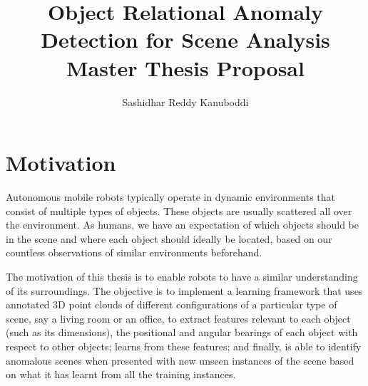 \documentclass[12pt]{article}
\begin{document}

\title{\textbf{Object Relational Anomaly Detection for Scene Analysis}\bigbreak
Master Thesis Proposal}
\author{Sashidhar Reddy Kanuboddi}

\maketitle


\newpage

\tableofcontents{}


\newpage

\section{Motivation}

Autonomous mobile robots typically operate in dynamic environments that consist of multiple types of objects. These objects are usually scattered all over the environment. As humans, we have an expectation of which objects should be in the scene and where each object should ideally be located, based on our countless observations of similar environments beforehand.

The motivation of this thesis is to enable robots to have a similar understanding of its surroundings. The objective is to implement a learning framework that uses annotated 3D point clouds of different configurations of a particular type of scene, say a living room or an office, to extract features relevant to each object (such as its dimensions), the positional and angular bearings of each object with respect to other objects; learns from these features; and finally, is able to identify anomalous scenes when presented with new unseen instances of the scene based on what it has learnt from all the training instances.
\end{document}
